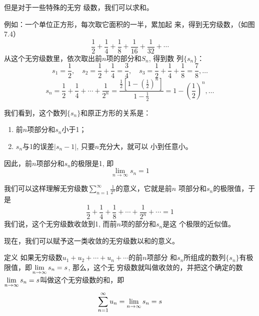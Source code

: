 但是对于一些特殊的无穷
级数，我们可以求和。

\begin{figure}[htp]
    \centering
    \caption{}
\end{figure}

例如：一个单位正方形，每次取它面积的一半，累加起
来，得到无穷级数，（如图7.4）
\[\frac{1}{2}+\frac{1}{4}+\frac{1}{8}+\frac{1}{16}+\frac{1}{32}+\cdots\]
从这个无穷级数里，依次取出前$n$项的部分和$S_n$, 得到数
列$\{s_n\}$：
\[s_1=\frac{1}{2},\quad s_2=\frac{1}{2}+\frac{1}{4}=\frac{3}{4},\quad s_3=\frac{1}{2}+\frac{1}{4}+\frac{1}{8}=\frac{7}{8},\ldots\]
\[s_n=\frac{1}{2}+\frac{1}{4}+\cdots+\frac{1}{2^n}=\frac{\frac{1}{2}\left[1-\left(\frac{1}{2}\right)^n\right]}{1-\frac{1}{2}}=1-\left(\frac{1}{2}\right)^n,\ldots\]

我们看到，这个数列$\{s_n\}$和原正方形的关系是：
\begin{enumerate}
    \item 前$n$项部分和$s_n$小于1；
    \item $s_n$与1的误差$|s_n-1|$, 只要$n$充分大，就可以
小到任意小。
\end{enumerate}
因此，前$n$项部分和$s_n$的极限是1, 即
\[\lim_{n\to\infty} s_n=1 \]

我们可以这样理解无穷级数$\displaystyle\sum_{n=1}^{\infty}\frac{1}{2^n}$的意义，它就是前$n$
项部分和$s_n$的极限值，于是
\[\frac{1}{2}+\frac{1}{4}+\frac{1}{8}+\cdots+\frac{1}{2^n}+\cdots=1 \]
我们说，这个无穷级数收敛到1, 而前$n$项的部分和$s_n$是这
个极限的近似值。

现在，我们可以赋予这一类收敛的无穷级数以和的意义。

\begin{blk}{定义}
    如果无穷级数$u_1+u_2+\cdots+u_n+\cdots$的前$n$项部分
和$s_n$所组成的数列$\{s_n\}$有极限值，即$\displaystyle\lim_{n\to\infty}s_n=s$, 那么，这个无
穷级数就叫做收敛的，并把这个确定的数$\displaystyle\lim_{n\to\infty}s_n=s$叫做这个无穷级数的和，即
\[\sum_{n=1}^{\infty}u_n=\displaystyle\lim_{n\to\infty}s_n=s\]
\end{blk}
 
